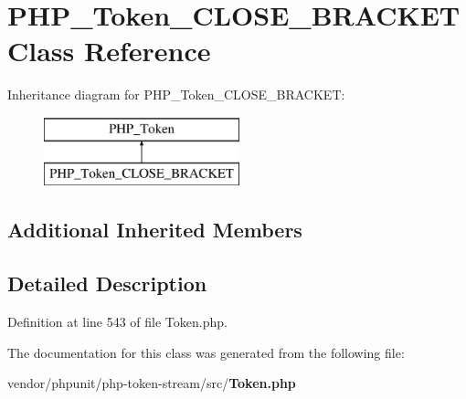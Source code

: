 \section{P\+H\+P\+\_\+\+Token\+\_\+\+C\+L\+O\+S\+E\+\_\+\+B\+R\+A\+C\+K\+E\+T Class Reference}
\label{class_p_h_p___token___c_l_o_s_e___b_r_a_c_k_e_t}
Inheritance diagram for P\+H\+P\+\_\+\+Token\+\_\+\+C\+L\+O\+S\+E\+\_\+\+B\+R\+A\+C\+K\+E\+T\+:\begin{figure}[H]
\begin{center}
\leavevmode
\includegraphics[height=2.000000cm]{class_p_h_p___token___c_l_o_s_e___b_r_a_c_k_e_t}
\end{center}
\end{figure}
\subsection*{Additional Inherited Members}


\subsection{Detailed Description}


Definition at line 543 of file Token.\+php.



The documentation for this class was generated from the following file\+:\begin{DoxyCompactItemize}
\item 
vendor/phpunit/php-\/token-\/stream/src/{\bf Token.\+php}\end{DoxyCompactItemize}

